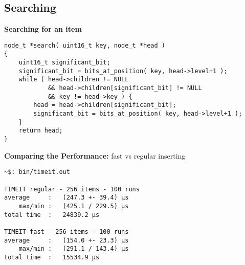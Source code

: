 \subsection{Searching}
\begin{frame}[fragile]
    \textbf{Searching for an item}
    \begin{verbatim}
node_t *search( uint16_t key, node_t *head )
{
    uint16_t significant_bit;
    significant_bit = bits_at_position( key, head->level+1 );
    while ( head->children != NULL
            && head->children[significant_bit] != NULL
            && key != head->key ) {
        head = head->children[significant_bit];
        significant_bit = bits_at_position( key, head->level+1 );
    }
    return head;
}
    \end{verbatim}
\end{frame}

\begin{frame}[fragile]
    \textbf{Comparing the Performance:} fast vs regular inserting \\
    \begin{verbatim}
~$: bin/timeit.out

TIMEIT regular - 256 items - 100 runs
average     :   (247.3 +- 39.4) μs
    max/min :   (425.1 / 229.5) μs
total time  :   24839.2 μs

TIMEIT fast - 256 items - 100 runs
average     :   (154.0 +- 23.3) μs
    max/min :   (291.1 / 143.4) μs
total time  :   15534.9 μs

    \end{verbatim}
\end{frame}

